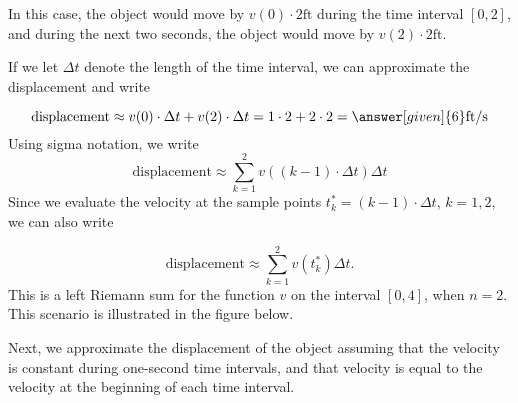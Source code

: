 \documentclass{ximera}
\begin{document}
\begin{example}
\begin{explanation}
In this case,  the object would move by $v(0)\cdot2 \mathrm{ft}$ during the time interval $[0,2]$, and during the next two seconds, the object would move by $v(2)\cdot2 \mathrm{ft}$.
 
  
If we let $\Delta t$ denote the length of the time interval, we can approximate the displacement  and write

  \[
   \text{displacement}\approx v(0)\cdot\Delta t+v(2)\cdot\Delta t=1\cdot2+2\cdot2=\answer[given]{6} \mathrm{ft}/\mathrm{s}
  \]
Using sigma notation, we write
\[
   \text{displacement}\approx \sum_{k=1}^2v((k-1)\cdot\Delta t)\Delta t
  \]
Since we evaluate the velocity at the sample points $t_{k}^*=(k-1)\cdot\Delta t$, $k=1,2$, we can also  write

\[
   \text{displacement}\approx \sum_{k=1}^2v(t_{k}^*)\Delta t.
  \]
  This is a left Riemann sum for the function $v$ on the interval $[0,4]$, when $n=2$.
This scenario is illustrated in the figure below.
\begin{image}
\end{image}
Next, we approximate the displacement of the object assuming that the velocity is constant during one-second time intervals, and that velocity is equal to the velocity at the beginning of each time interval.



\end{explanation}
\end{example}
\end{document}
